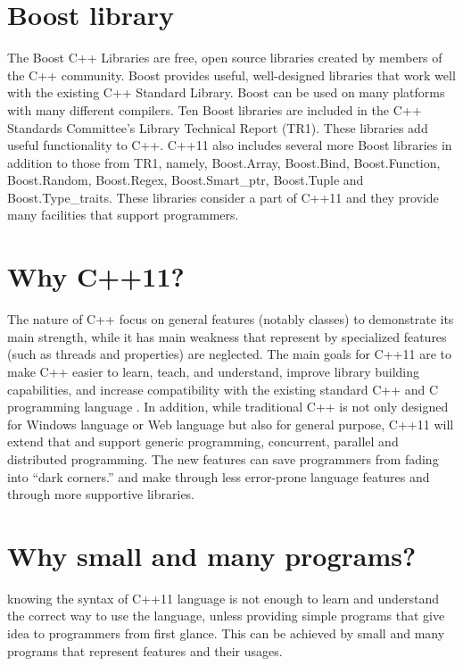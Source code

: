 \documentclass[12pt,a4paper]{report}
\begin{document}
\section{Boost library}
\label{section: Boost library}
The Boost C++ Libraries are free, open source libraries created by members of the C++ community. Boost provides useful, well-designed libraries that work well with the existing C++ Standard Library. Boost can be used on many platforms with many different compilers. Ten Boost libraries are included in the C++ Standards Committee's Library Technical Report (TR1). These libraries add useful functionality to C++.  C++11 also includes several more Boost libraries in addition to those from TR1, namely, Boost.Array, Boost.Bind, Boost.Function, Boost.Random, Boost.Regex, Boost.Smart\_ptr, Boost.Tuple and Boost.Type\_traits. These libraries consider a part of C++11 and they provide many facilities that support programmers\cite{Deitel:2012:CPP}.


\section{Why C++11?}
\label{secton: Why C++11}
The nature of C++ focus on general features (notably classes) to demonstrate its main strength, while it has main weakness that represent by specialized features (such as threads and properties) are neglected.
\newline
The main goals for C++11 are to make C++ easier to learn, teach, and understand, improve library building capabilities, and increase compatibility with the existing standard C++ and C programming language \cite{Deitel:2012:CPP}.
\newline
In addition, while traditional C++ is not only designed for Windows language or Web language but also for general purpose, C++11 will extend that and support generic programming, concurrent, parallel and distributed programming. 
The new features can save programmers from fading into “dark corners.” and make through less error-prone language features and through more supportive libraries.


\section{Why small and many programs?}
\label{section: why small and many programs}
knowing the syntax of C++11 language is not enough to learn and understand the correct way to use the language, unless providing  simple  programs that give idea to programmers from first glance. This can be achieved by small and many programs that represent features and their usages.
\end{document}
